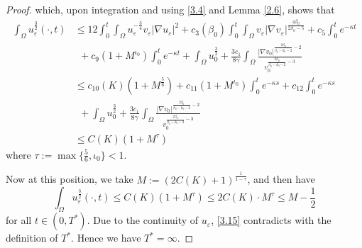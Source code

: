 \documentclass[10pt,a4paper]{amsart}
\newtheorem{lemma}{Lemma}
\begin{document}
\begin{proof}
which, upon integration and using \eqref{3.4} and Lemma \ref{2.6}, shows that
\begin{align}\label{3.14}
       \int_\Omega u_\varepsilon^{\frac{3}{2}}(\cdot,t)&\leq 12\int_0^t\int_{\Omega}u_\varepsilon^{-\frac{3}{4}}v_\varepsilon|\nabla u_\varepsilon|^2\nonumber+c_3(\beta_0)\int_0^t\int_\Omega v_\varepsilon|\nabla v_\varepsilon|^{\frac{4\beta_0}{2\beta_0-5}}+c_5\int_0^t e^{-\kappa t}\\
       &~~+c_9 (1+M^{\iota_0})\int_0^t e^{-\kappa t}+\int_\Omega u_0^{\frac{3}{2}}+\frac{3c_1}{8\gamma}
       \int_\Omega\frac{|\nabla v_0|^{\frac{2\beta_0}{\beta_0-k_0-2}-2}}
       {v_0^{\frac{2\beta_0}{\beta_0-k_0-2}-3}}\\
       &\leq c_{10}(K)(1+M^{\frac{5}{6}})+c_{11}(1+ M^{\iota_0})\int_0^{t}e^{-\kappa s}+c_{12}\int_0^{t}e^{-\kappa s}\nonumber\\
       &~~+\int_\Omega u_0^{\frac{3}{2}}
       +\frac{3c_1}{8\gamma}\int_\Omega\frac{|\nabla v_0|^{\frac{2\beta_0}{\beta_0-k_0-2}-2}}
       {v_0^{\frac{2\beta_0}{\beta_0-k_0-2}-3}}\nonumber\\
       &\leq C(K)(1+M^{\tau})\nonumber
\end{align}
where $\tau:=\max\{\frac{5}{6},\iota_0\}<1$.

Now at this position, we take  $M:=(2C(K)+1
)^{\frac{1}{1-\tau}}$, and then have
\begin{equation}\label{3.15}
    \int_\Omega u_\varepsilon^{\frac{3}{2}}(\cdot,t)\leq C(K)(1+ M^{\tau})\leq 2C(K)\cdot M^{\tau}\leq M-\frac 12
\end{equation}
for all $t\in(0,T^*)$. Due to the continuity of $u_\varepsilon$, \eqref{3.15} contradicts with the definition of $T^*$. Hence we have $T^*=\infty$.
\end{proof}
\end{document}
